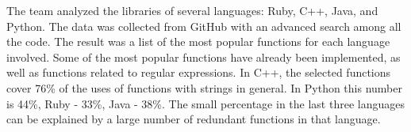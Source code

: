 \documentclass[11pt,nonacm,natbib=false]{acmart}
\begin{document}
\begin{enumerate}
The team analyzed the libraries of several languages: Ruby, C++, Java, and Python. The data was collected from GitHub with an advanced search among all the code. The result was a list of the most popular functions for each language involved. Some of the most popular functions have already been implemented, as well as functions related to regular expressions. In C++, the selected functions cover 76\% of the uses of functions with strings in general. In Python this number is 44\%, Ruby - 33\%, Java - 38\%. The small percentage in the last three languages can be explained by a large number of redundant functions in that language.
\end{enumerate}
\end{document}
